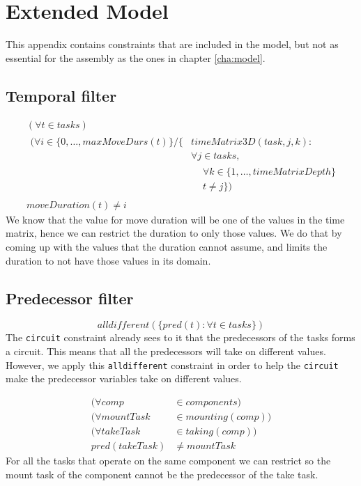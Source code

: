  \chapter{Extended Model}\label{app:ext_mod}
This appendix contains constraints that are included in the model, but not as essential for the assembly as the ones in chapter \ref{cha:model}.

\section{Temporal filter}
  \begin{equation}
  \begin{aligned}\label{eq:67}
  &(\forall t \in tasks)\\
  &\begin{aligned}
  (\forall i \in \{0 , \ldots , maxMoveDurs(t)\} / \{&timeMatrix3D(task,j,k) :\\
  &\forall j \in tasks,\\
  &\begin{aligned}
  &\forall k \in \{1 , \ldots , timeMatrixDepth\}\\
  &t \neq j\})
  \end{aligned}
  \end{aligned}\\
  &moveDuration(t) \neq i
  \end{aligned}
  \end{equation}
 We know that the value for move duration will be one of the values in the time matrix, hence we can restrict the duration to only those values. We do that by coming up with the values that the duration cannot assume, and limits the duration to not have those values in its domain.

\section{Predecessor filter}
\begin{equation}\label{eq:74}
  alldifferent(\{pred(t) : \forall t \in tasks\})
  \end{equation}
 The \texttt{circuit} constraint already sees to it that the predecessors of the tasks forms a circuit. This means that all the predecessors will take on different values. However, we apply this \texttt{alldifferent} constraint in order to help the \texttt{circuit} make the predecessor variables take on different values.

 \begin{equation}
  \begin{aligned}\label{eq:85}
  (\forall comp &\in components) \\
  (\forall mountTask &\in mounting(comp)) \\
  (\forall takeTask &\in taking(comp)) \\
  pred(takeTask) &\neq mountTask
  \end{aligned}
  \end{equation}
  For all the tasks that operate on the same component we can restrict so the mount task of the component cannot be the predecessor of the take task. 
  
